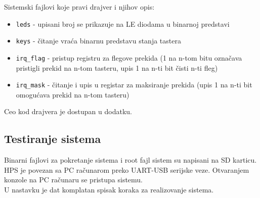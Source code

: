 Sistemski fajlovi koje pravi drajver i njihov opis:
\begin{itemize}
\item \texttt{leds} - upisani broj se prikazuje na LE diodama u binarnoj predstavi
\item \texttt{keys} - čitanje vraća binarnu predstavu stanja tastera
\item \texttt{irq\_flag} - pristup registru za flegove prekida (1 na n-tom bitu označava pristigli prekid na n-tom tasteru, upis 1 na n-ti bit čisti n-ti fleg)
\item \texttt{irq\_mask} - čitanje i upis u registar za maksiranje prekida (upis 1 na n-ti bit omogućava prekid na n-tom tasteru)
\end{itemize}

Ceo kod drajvera je dostupan u dodatku.
\subsection*{Testiranje sistema}
Binarni fajlovi za pokretanje sistema i root fajl sistem su napisani na SD karticu. HPS je povezan sa PC računarom preko UART-USB serijske veze. Otvaranjem konzole na PC računaru se pristupa sistemu.\\
U nastavku je dat komplatan spisak koraka za realizovanje sistema.



